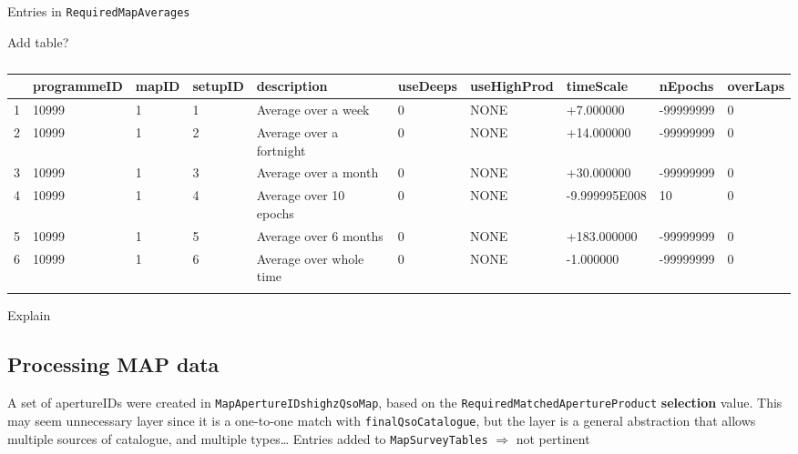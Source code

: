 \documentclass[usenatbib]{mnras}
\begin{document}
Entries in \verb+RequiredMapAverages+

Add table?
\begin{table*}
  \begin{center}
    \setlength{\tabcolsep}{4pt}
    \begin{tabular}{lll lll lll l}
\hline \hline
                &  programmeID &	mapID &	setupID  &	description               &	useDeeps  &	useHighProd &	timeScale	    &  nEpochs     &	overLaps\\
\hline
      1	& 10999	           &    1       &	1            &      Average over a week	 &     0        & 	NONE            &	+7.000000  &	-99999999 &	0\\
      2	& 10999             & 	 1	  & 2   	     & Average over a fortnight &	0        &	NONE	&+14.000000	&-99999999 &	0\\
      3	& 10999	           &    1  	 & 3	             & Average over a month	&      0        &	NONE	&+30.000000	&-99999999 &	0\\
      4	& 10999             & 	 1	 & 4	              & Average over 10 epochs &	0        &	NONE	&-9.999995E008 &	10 &	0\\
      5	& 10999             &	 1	 & 5	             & Average over 6 months   &	0        &	NONE	&+183.000000 &	-99999999 &	0\\
      6	& 10999            &	 1	 & 6	           & Average over whole time  &	0        &	NONE	&-1.000000 &	-99999999 &	0\\
      \hline \hline
      \label{tab:The_Numbers}
    \end{tabular}
    \caption{}
  \end{center}
\end{table*}


Explain
 
\subsection{Processing MAP data}

A set of apertureIDs were created in \verb+MapApertureIDshighzQsoMap+, based on
the \verb+RequiredMatchedApertureProduct+ {\bf selection} value. This may
seem unnecessary layer since it is a one-to-one match with \verb+finalQsoCatalogue+,
but the layer is a general abstraction that allows multiple sources of
catalogue, and multiple types\ldots
Entries added to \verb+MapSurveyTables+ $\Rightarrow$ not pertinent
\end{document}
